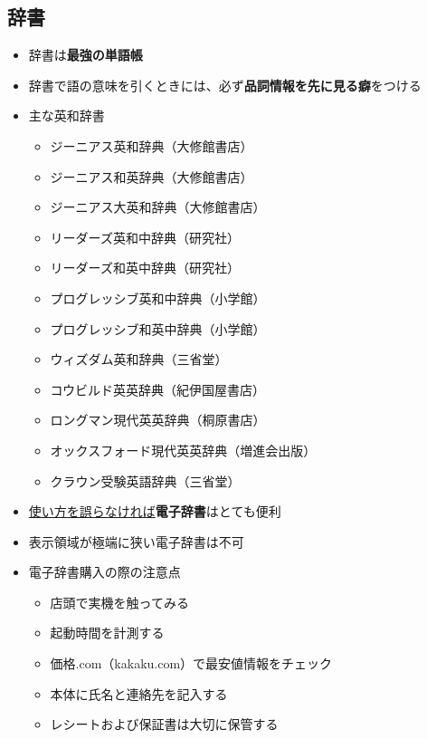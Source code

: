 \documentclass[12pt,titlepage]{jsarticle}
\begin{document}
 \subsection*{辞書}
  \begin{itemize}
   \item 辞書は{\bf 最強の単語帳}
   \item 辞書で語の意味を引くときには、必ず{\bf 品詞情報を先に見る癖}をつける
   \item 主な英和辞書
         \begin{itemize}
          \item ジーニアス英和辞典（大修館書店）
          \item ジーニアス和英辞典（大修館書店）
          \item ジーニアス大英和辞典（大修館書店）
          \item リーダーズ英和中辞典（研究社）
          \item リーダーズ和英中辞典（研究社）
          \item プログレッシブ英和中辞典（小学館）
          \item プログレッシブ和英中辞典（小学館）
          \item ウィズダム英和辞典（三省堂）
          \item コウビルド英英辞典（紀伊国屋書店）
          \item ロングマン現代英英辞典（桐原書店）
          \item オックスフォード現代英英辞典（増進会出版）
          \item クラウン受験英語辞典（三省堂）
         \end{itemize}
   \item \underline{使い方を誤らなければ}{\bf 電子辞書}はとても便利
   \item 表示領域が極端に狭い電子辞書は不可
   \item 電子辞書購入の際の注意点
         \begin{itemize}
          \item 店頭で実機を触ってみる
          \item 起動時間を計測する
          \item 価格.com（kakaku.com）で最安値情報をチェック
          \item 本体に氏名と連絡先を記入する
          \item レシートおよび保証書は大切に保管する
         \end{itemize}
  \end{itemize}
\end{document}
